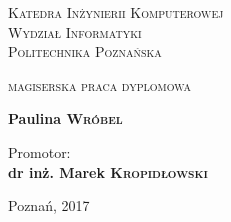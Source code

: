 \begin{titlepage}

\begin{center}

\fontsize{14pt}{20pt}\selectfont
\textsc{Katedra Inżynierii Komputerowej\\Wydział Informatyki\\Politechnika Poznańska}

\vfill\vfill\vfill

\fontsize{12pt}{18pt}\selectfont
\textsc{magiserska praca dyplomowa}

\vfill

\fontsize{18pt}{27pt}\selectfont
\textbf{\textsc{\thetitle}}

\vfill

\fontsize{14pt}{20pt}\selectfont
\textbf{Paulina \textsc{Wróbel}}

\end{center}

\vfill\vfill\vfill

\begin{flushright}

\fontsize{12pt}{18pt}\selectfont
Promotor: \\
\textbf{dr inż. Marek \textsc{Kropidłowski}}

\end{flushright}

\vfill\vfill

\begin{center}
Poznań, 2017
\end{center}

\end{titlepage}

\fontsize{11pt}{18pt}\selectfont
